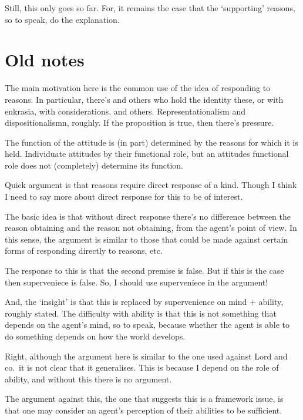 \documentclass[10pt]{article}
\begin{document}
Still, this only goes so far.
For, it remains the case that the `supporting' reasons, so to speak, do the explanation.

\newpage

\printbibliography


\newpage

\section{Old notes}
\label{sec:old-notes}

The main motivation here is the common use of the idea of responding to reasons.
In particular, there's \citeauthor{Lord:2018aa} and others who hold the identity these, or \citeauthor{Broome:2013aa} with enkrasia, \citeauthor{Hieronymi:2018aa} with considerations, and others.
Representationalism and dispositionalismn, roughly.
If the proposition is true, then there's pressure.

\begin{note}
  The function of the attitude is (in part) determined by the reasons for which it is held.
  Individuate attitudes by their functional role, but an attitudes functional role does not (completely) determine its function.
\end{note}

\begin{note}
  Quick argument is that reasons require direct response of a kind.
  Though I think I need to say more about direct response for this to be of interest.

  The basic idea is that without direct response there's no difference between the reason obtaining and the reason not obtaining, from the agent's point of view.
  In this sense, the argument is similar to those that could be made against certain forms of responding directly to reasons, etc.

  The response to this is that the second premise is false.
  But if this is the case then superveniece is false.
  So, I should use superveniece in the argument!

  And, the `insight' is that this is replaced by supervenience on mind + ability, roughly stated.
  The difficulty with ability is that this is not something that depends on the agent's mind, so to speak, because whether the agent is able to do something depends on how the world develops.

  Right, although the argument here is similar to the one used against Lord and co.\ it is not clear that it generalises.
  This is because I depend on the role of ability, and without this there is no argument.

  The argument against this, the one that suggests this is a framework issue, is that one may consider an agent's perception of their abilities to be sufficient.
\end{note}
\end{document}

